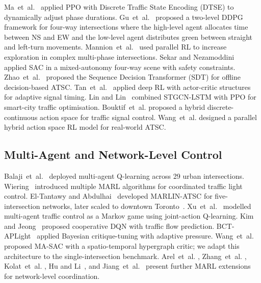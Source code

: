 \documentclass[conference]{IEEEtran}
\begin{document}
Ma~et~al.~\cite{Ma2021AdaptiveOOK} applied PPO with Discrete
Traffic State Encoding (DTSE) to dynamically adjust phase
durations. Gu~et~al.~\cite{Gu2025AHDL} proposed a two-level DDPG
framework for four-way intersections where the high-level agent
allocates time between NS and EW and the low-level agent
distributes green between straight and left-turn movements.
Mannion~et~al.~\cite{Mannion2015ParallelRLAK} used parallel RL to
increase exploration in complex multi-phase intersections.
Sekar and Nezamoddini~\cite{Sekar2025OptimizingMIB} applied SAC in
a mixed-autonomy four-way scene with safety constraints.
Zhao~et~al.~\cite{Zhao2024SequenceDTAH} proposed the Sequence
Decision Transformer (SDT) for offline decision-based ATSC.
Tan~et~al.~\cite{Tan2019DeepRLBH, Tan2022DeepRLBJ} applied deep RL
with actor-critic structures for adaptive signal timing.
Lin and Lin~\cite{Lin2025SmartCTAZ} combined STGCN-LSTM with PPO
for smart-city traffic optimisation. Bouktif~et~al.
\cite{Bouktif2021TrafficSCBM} proposed a hybrid discrete-continuous
action space for traffic signal control. Wang~et~al.
\cite{Wang2025APHBB} designed a parallel hybrid action space RL
model for real-world ATSC.

\subsection{Multi-Agent and Network-Level Control}

Balaji~et~al.~\cite{Balaji2010UrbanTSJ} deployed multi-agent
Q-learning across 29 urban intersections.
Wiering~\cite{Wiering2000MultiAgentRLAF} introduced multiple MARL
algorithms for coordinated traffic light control.
El-Tantawy and Abdulhai~\cite{ElTantawy2012MultiAgentRLY} developed
MARLIN-ATSC for five-intersection networks, later scaled to
downtown Toronto~\cite{ElTantawy2013MultiagentRLAG}.
Xu~et~al.~\cite{Xu2013TheSOAL} modelled multi-agent traffic control
as a Markov game using joint-action Q-learning.
Kim and Jeong~\cite{Kim2019CooperativeTSAB} proposed cooperative
DQN with traffic flow prediction. BCT-APLight~\cite{2024BayesianCRT}
applied Bayesian critique-tuning with adaptive pressure.
Wang~et~al.~\cite{Wang2024TowardMRP} proposed MA-SAC with a
spatio-temporal hypergraph critic; we adapt this architecture to
the single-intersection benchmark. Arel~et~al.
\cite{Arel2010ReinforcementLMBT}, Zhang~et~al.
\cite{Zhang2021IndependentRLAW}, Kolat~et~al.
\cite{Kolat2023MultiAgentRLAN}, Hu and Li~\cite{Hu2024AMDBA}, and
Jiang~et~al.~\cite{Jiang2022MultiAgentRLBV} present further MARL
extensions for network-level coordination.
\end{document}
